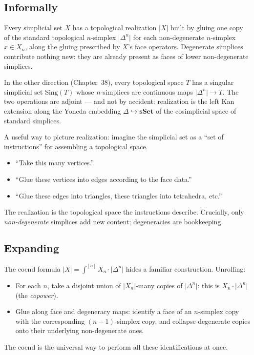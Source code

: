 \subsection{Informally}

Every simplicial set $X$ has a topological realization $\lvert X\rvert$
built by gluing one copy of the standard topological $n$-simplex
$\lvert\Delta^n\rvert$ for each non-degenerate $n$-simplex $x \in X_n$,
along the gluing prescribed by $X$'s face operators. Degenerate simplices
contribute nothing new: they are already present as faces of lower
non-degenerate simplices.

In the other direction (Chapter~38), every topological space $T$ has a
singular simplicial set $\mathrm{Sing}(T)$ whose $n$-simplices are
continuous maps $\lvert\Delta^n\rvert \to T$. The two operations are
adjoint — and not by accident: realization is the left Kan extension
along the Yoneda embedding $\Delta \hookrightarrow \mathbf{sSet}$ of the
cosimplicial space of standard simplices.

\begin{readernote}
A useful way to picture realization: imagine the simplicial set as a
``set of instructions'' for assembling a topological space.
\begin{itemize}
  \item ``Take this many vertices.''
  \item ``Glue these vertices into edges according to the face data.''
  \item ``Glue these edges into triangles, these triangles into
        tetrahedra, etc.''
\end{itemize}
The realization is the topological space the instructions describe.
Crucially, only \emph{non-degenerate} simplices add new content;
degeneracies are bookkeeping.
\end{readernote}

\subsection{Expanding}

The coend formula $\lvert X\rvert = \int^{[n]} X_n \cdot \lvert\Delta^n\rvert$
hides a familiar construction. Unrolling:

\begin{itemize}
  \item For each $n$, take a disjoint union of $\lvert X_n\rvert$-many
        copies of $\lvert\Delta^n\rvert$: this is $X_n \cdot
        \lvert\Delta^n\rvert$ (the \emph{copower}).
  \item Glue along face and degeneracy maps: identify a face of an
        $n$-simplex copy with the corresponding $(n-1)$-simplex copy,
        and collapse degenerate copies onto their underlying
        non-degenerate ones.
\end{itemize}
The coend is the universal way to perform all these identifications at once.

